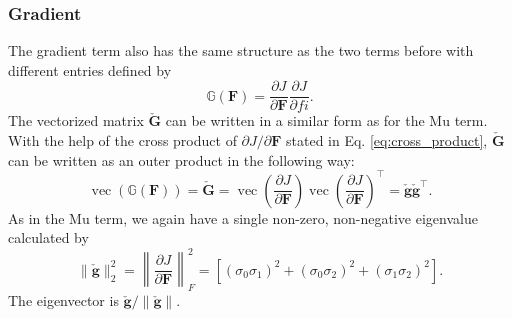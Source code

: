 \subsubsection{Gradient}
The gradient term also has the same structure as the two terms before with different entries defined by
\[
\mathbb{G}(\mathbf{F}) = \frac{\partial J}{\partial \mathbf{F}} \frac{\partial J}{\partial fi}.
\]
The vectorized matrix $\mathbf{\check{G}}$ can be written in a similar form as for the Mu term. With the help of the cross product of $\partial J / \partial \mathbf{F}$ stated in Eq. \ref{eq:cross_product}, $\mathbf{\check{G}}$ can be written as an outer product in the following way:
\[
\operatorname{vec}(\mathbb{G}(\mathbf{F})) = \mathbf{\check{G}} = \operatorname{vec}\left(\frac{\partial J}{\partial \mathbf{F}}\right) \operatorname{vec}\left(\frac{\partial J}{\partial \mathbf{F}}\right)^\intercal = \mathbf{\check{g}} \mathbf{\check{g}}^\intercal.
\]
As in the Mu term, we again have a single non-zero, non-negative eigenvalue calculated by
\[
\| \mathbf{\check{g}} \|^2_2 = \left\| \frac{\partial J}{\partial \mathbf{F}} \right \|^2_F = \left[ (\sigma_0 \sigma_1)^2 + (\sigma_0 \sigma_2)^2 + (\sigma_1 \sigma_2)^2 \right].
\]
The eigenvector is $\mathbf{\check{g}} / \| \mathbf{\check{g}} \|$.



